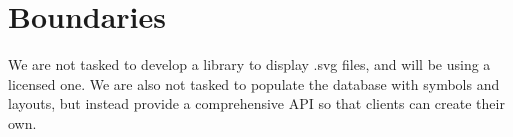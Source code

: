 \documentclass[12pt,a4paper,notitlepage]{report}
\begin{document}





\section{Boundaries}
We are not tasked to develop a library to display .svg files, and will be using a licensed one. We are also not tasked to populate the database with symbols and layouts, but instead provide a comprehensive API so that clients can create their own.
\end{document}
